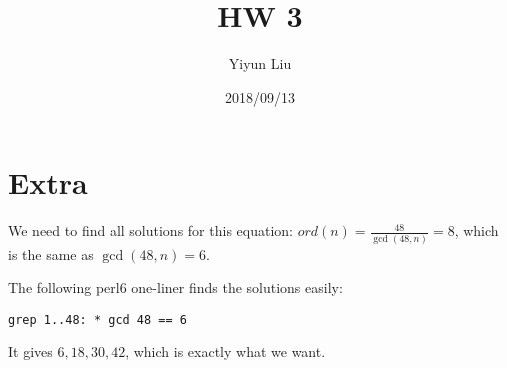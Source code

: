 \documentclass{article}
\title{HW 3}
\date{2018/09/13}
\author{Yiyun Liu}
\begin{document}
\maketitle
\lstset{basicstyle=\ttfamily}

\section*{Extra}
We need to find all solutions for this equation:
$ord(n)=\frac{48}{\gcd(48,n)}=8$, which is the same as $\gcd(48,n) =
6$.

The following perl6 one-liner finds the solutions easily:
\begin{lstlisting}
grep 1..48: * gcd 48 == 6
\end{lstlisting}

It gives $6,18,30,42$, which is exactly what we want.
\end{document}
